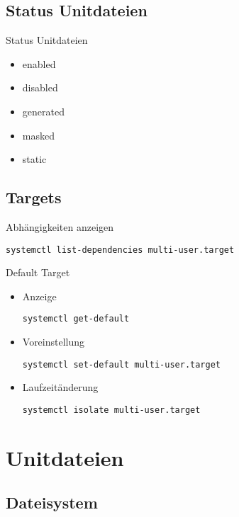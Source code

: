 \subsection{Status Unitdateien}

\begin{frame}[fragile]{Status Unitdateien}
\begin{itemize}
\item enabled
\item disabled
\item generated
\item masked
\item static
\end{itemize}
\end{frame}


\subsection{Targets}

\begin{frame}[fragile]{Abhängigkeiten anzeigen}
\begin{lstlisting}
systemctl list-dependencies multi-user.target
\end{lstlisting}
\end{frame}

\begin{frame}[fragile]{Default Target}
  \begin{itemize}
    \item Anzeige

    \verb|systemctl get-default|

    \item Voreinstellung

    \verb|systemctl set-default multi-user.target|

    \item Laufzeitänderung

    \verb|systemctl isolate multi-user.target|
  \end{itemize}
\end{frame}

\section{Unitdateien}

\subsection{Dateisystem}

